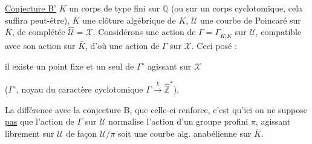 \uline{Conjecture B'}  $K$ un corps de type fini sur $\mathbb{Q}$ (ou sur un corps cyclotomique, cela suffira peut-être), $\bar K$ une clôture algébrique de $K$, $\mathcal U$ une courbe de Poincaré sur $\bar K$, de complétée $\widehat{\mathcal U}=\mathcal X$. Considérons une action de $\Gamma=\Gamma_{\bar K|K}$ sur $\mathcal U$, compatible avec son action sur $\bar K$, d'où une action de $\Gamma$ sur $\mathcal X$. Ceci posé :

il existe un point fixe et un seul de $\Gamma^\circ$ agissant sur $\mathcal X$

($\Gamma^\circ$, noyau du caractère cyclotomique $\Gamma\xrightarrow{\chi}\widehat{\mathbb Z}^{\!*}$).

La différence avec la conjecture B, que celle-ci renforce, c'est qu'ici on ne suppose \uline{pas} que l'action de $\Gamma$ sur $\mathcal U$ normalise l'action d'un groupe profini $\pi$, agissant librement sur $\mathcal U$ de façon  $\mathcal U/\pi$ soit une courbe alg. anabélienne sur $\bar K$.
